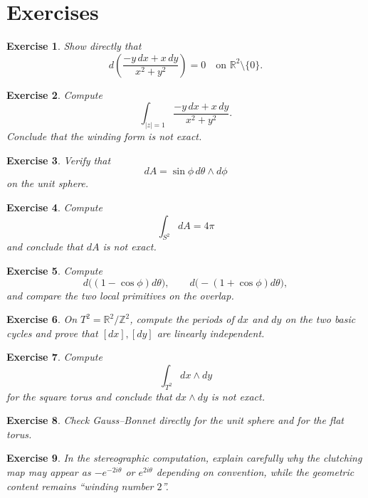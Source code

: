 \documentclass[11pt]{article}
\newtheorem{exercise}{Exercise}
\begin{document}
	\section{Exercises}
	
	\begin{exercise}
		Show directly that
		\[
		d\!\left(\frac{-y\,dx+x\,dy}{x^2+y^2}\right)=0
		\quad\text{on }\mathbb{R}^2\setminus\{0\}.
		\]
	\end{exercise}
	
	\begin{exercise}
		Compute
		\[
		\int_{|z|=1}\frac{-y\,dx+x\,dy}{x^2+y^2}.
		\]
		Conclude that the winding form is not exact.
	\end{exercise}
	
	\begin{exercise}
		Verify that
		\[
		dA=\sin\phi\,d\theta\wedge d\phi
		\]
		on the unit sphere.
	\end{exercise}
	
	\begin{exercise}
		Compute
		\[
		\int_{S^2}dA=4\pi
		\]
		and conclude that \(dA\) is not exact.
	\end{exercise}
	
	\begin{exercise}
		Compute
		\[
		d\bigl((1-\cos\phi)d\theta\bigr),\qquad
		d\bigl(-(1+\cos\phi)d\theta\bigr),
		\]
		and compare the two local primitives on the overlap.
	\end{exercise}
	
	\begin{exercise}
		On \(T^2=\mathbb{R}^2/\mathbb{Z}^2\), compute the periods of \(dx\) and \(dy\) on the two basic cycles and prove that \([dx],[dy]\) are linearly independent.
	\end{exercise}
	
	\begin{exercise}
		Compute
		\[
		\int_{T^2}dx\wedge dy
		\]
		for the square torus and conclude that \(dx\wedge dy\) is not exact.
	\end{exercise}
	
	\begin{exercise}
		Check Gauss--Bonnet directly for the unit sphere and for the flat torus.
	\end{exercise}
	
	\begin{exercise}
		In the stereographic computation, explain carefully why the clutching map may appear as \(-e^{-2i\theta}\) or \(e^{2i\theta}\) depending on convention, while the geometric content remains ``winding number \(2\)''.
	\end{exercise}
	
\end{document}
